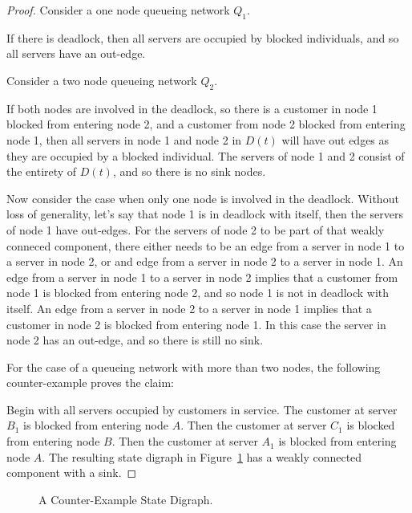 \documentclass{article}
\begin{document}
\begin{proof}
Consider a one node queueing network $Q_1$.

If there is deadlock, then all servers are occupied by blocked individuals, and so all servers have an out-edge.

Consider a two node queueing network $Q_2$.

If both nodes are involved in the deadlock, so there is a customer in node 1 blocked from entering node 2, and a customer from node 2 blocked from entering node 1, then all servers in node 1 and node 2 in $D(t)$ will have out edges as they are occupied by a blocked individual.
The servers of node 1 and 2 consist of the entirety of $D(t)$, and so there is no sink nodes.

Now consider the case when only one node is involved in the deadlock.
Without loss of generality, let's say that node 1 is in deadlock with itself, then the servers of node 1 have out-edges.
For the servers of node 2 to be part of that weakly conneced component, there either needs to be an edge from a server in node 1 to a server in node 2, or and edge from a server in node 2 to a server in node 1.
An edge from a server in node 1 to a server in node 2 implies that a customer from node 1 is blocked from entering node 2, and so node 1 is not in deadlock with itself.
An edge from a server in node 2 to a server in node 1 implies that a customer in node 2 is blocked from entering node 1.
In this case the server in node 2 has an out-edge, and so there is still no sink.

For the case of a queueing network with more than two nodes, the following counter-example proves the claim:

Begin with all servers occupied by customers in service.
The customer at server $B_1$ is blocked from entering node $A$.
Then the customer at server $C_1$ is blocked from entering node $B$.
Then the customer at server $A_1$ is blocked from entering node $A$.
The resulting state digraph in Figure~\ref{fig:counter_example} has a weakly connected component with a sink.
\end{proof}

\begin{figure}
\begin{center}

\end{center}
\caption{A Counter-Example State Digraph.}
\label{fig:counter_example}
\end{figure}
\end{document}
